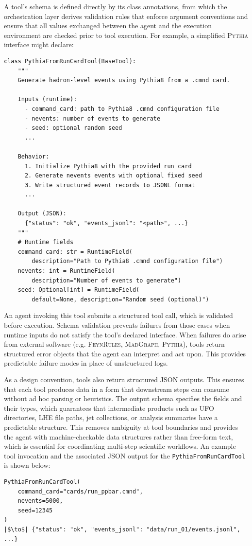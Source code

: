 \documentclass[11pt,oneside]{article}
\numberwithin{equation}{section}
\begin{document}
A tool’s schema is defined directly by its class annotations, from which the orchestration layer derives validation rules that enforce argument conventions and ensure that all values exchanged between the agent and the execution environment are checked prior to tool execution. 
For example, a simplified \textsc{Pythia} interface might declare:
\begin{graybox}
    \begin{verbatim}
class PythiaFromRunCardTool(BaseTool):
    """
    Generate hadron-level events using Pythia8 from a .cmnd card.

    Inputs (runtime):
      - command_card: path to Pythia8 .cmnd configuration file
      - nevents: number of events to generate
      - seed: optional random seed
      ...

    Behavior:
      1. Initialize Pythia8 with the provided run card
      2. Generate nevents events with optional fixed seed
      3. Write structured event records to JSONL format
      ...

    Output (JSON):
      {"status": "ok", "events_jsonl": "<path>", ...}
    """
    # Runtime fields
    command_card: str = RuntimeField(
        description="Path to Pythia8 .cmnd configuration file")
    nevents: int = RuntimeField(
        description="Number of events to generate")
    seed: Optional[int] = RuntimeField(
        default=None, description="Random seed (optional)")
    \end{verbatim}
\end{graybox}

An agent invoking this tool submits a structured tool call, which is validated before execution. Schema validation prevents failures from those cases when runtime inputs do not satisfy the tool's declared interface. 
When failures do arise from external software (e.g. \textsc{FeynRules}, \textsc{MadGraph}, \textsc{Pythia}), tools return structured error objects that the agent can interpret and act upon. 
This provides predictable failure modes in place of unstructured logs.

As a design convention, tools also return structured JSON outputs. This ensures that each tool produces data in a form that downstream steps can consume without ad hoc parsing or heuristics. 
The output schema specifies the fields and their types, which guarantees that intermediate products such as UFO directories, LHE file paths, jet collections, or analysis summaries have a predictable structure. 
This removes ambiguity at tool boundaries and provides the agent with machine-checkable data structures rather than free-form text, which is essential for coordinating multi-step scientific workflows.
An example tool invocation and the associated JSON output for the \texttt{PythiaFromRunCardTool} is shown below:
\vspace{-0.2in}
\begin{verbatim}
PythiaFromRunCardTool(
    command_card="cards/run_ppbar.cmnd",
    nevents=5000,
    seed=12345
)
|$\to$| {"status": "ok", "events_jsonl": "data/run_01/events.jsonl", ...}
\end{verbatim}
\end{document}
